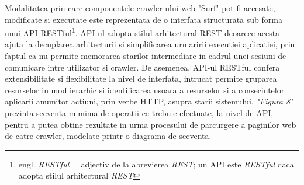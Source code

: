 Modalitatea prin care componentele crawler-ului web "Surf" pot fi accesate, modificate si executate este reprezentata de o interfata\cite{iterface-definition} structurata sub forma unui API RESTful\footnote{engl. \textit{RESTful} = adjectiv de la abrevierea \textit{REST}; un API este \textit{RESTful} daca adopta stilul arhitectural \textit{REST\cite{rest-definition}}}. API-ul adopta stilul arhitectural REST\cite{rest-definition} deoarece acesta ajuta la decuplarea arhitecturii si simplificarea urmaririi executiei aplicatiei, prin faptul ca nu permite memorarea starilor intermediare in cadrul unei sesiuni de comunicare intre utilizator si crawler. De asemenea, API-ul RESTful confera extensibilitate si flexibilitate la nivel de interfata, intrucat permite gruparea resurselor in mod ierarhic si identificarea usoara a resurselor si a consecintelor aplicarii anumitor actiuni, prin verbe HTTP, asupra starii sistemului. \textit{"Figura 8"} prezinta secventa mimima de operatii ce trebuie efectuate, la nivel de API, pentru a putea obtine rezultate in urma procesului de parcurgere a paginilor web de catre crawler, modelate printr-o diagrama de secventa.

